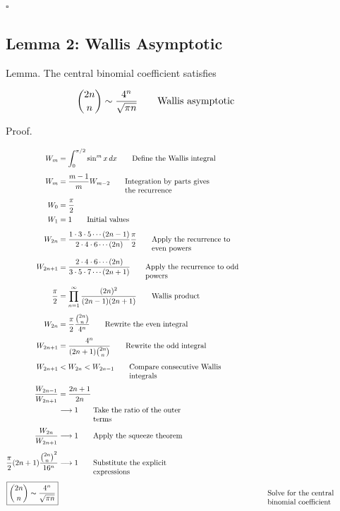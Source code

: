 \documentclass{article}
\newcommand{\justwidth}{0.36\textwidth}
\newcommand{\just}[1]{\parbox[t]{\justwidth}{\raggedright #1}}
\begin{document}
$\square$

\subsection{Lemma 2: Wallis Asymptotic}
Lemma. The central binomial coefficient satisfies

\begin{align*}
\binom{2n}{n}
&\sim
\frac{4^n}{\sqrt{\pi n}}
\tag*{\just{Wallis asymptotic}}
\end{align*}

Proof.

\begin{align*}
W_m
&=
\int_0^{\pi/2}
\sin^m x\,dx
\tag*{\just{Define the Wallis integral}}
\\[0.45em]
W_m
&=
\frac{m-1}{m}
W_{m-2}
\tag*{\just{Integration by parts gives the recurrence}}
\\[0.45em]
W_0
&=
\frac{\pi}{2}
\\
W_1
&=
1
\tag*{\just{Initial values}}
\\[0.45em]
W_{2n}
&=
\frac{1\cdot3\cdot5\cdots(2n-1)}
{2\cdot4\cdot6\cdots(2n)}
\frac{\pi}{2}
\tag*{\just{Apply the recurrence to even powers}}
\\[0.45em]
W_{2n+1}
&=
\frac{2\cdot4\cdot6\cdots(2n)}
{3\cdot5\cdot7\cdots(2n+1)}
\tag*{\just{Apply the recurrence to odd powers}}
\\[0.45em]
\frac{\pi}{2}
&=
\prod_{n=1}^{\infty}
\frac{(2n)^2}
{(2n-1)(2n+1)}
\tag*{\just{Wallis product}}
\\[0.45em]
W_{2n}
&=
\frac{\pi}{2}
\frac{\binom{2n}{n}}{4^n}
\tag*{\just{Rewrite the even integral}}
\\[0.45em]
W_{2n+1}
&=
\frac{4^n}
{(2n+1)\binom{2n}{n}}
\tag*{\just{Rewrite the odd integral}}
\\[0.45em]
W_{2n+1}
&<
W_{2n}
<
W_{2n-1}
\tag*{\just{Compare consecutive Wallis integrals}}
\\[0.45em]
\frac{W_{2n-1}}
{W_{2n+1}}
&=
\frac{2n+1}{2n}
\\
&\longrightarrow
1
\tag*{\just{Take the ratio of the outer terms}}
\\[0.45em]
\frac{W_{2n}}
{W_{2n+1}}
&\longrightarrow
1
\tag*{\just{Apply the squeeze theorem}}
\\[0.45em]
\frac{\pi}{2}
(2n+1)
\frac{\binom{2n}{n}^2}{16^n}
&\longrightarrow
1
\tag*{\just{Substitute the explicit expressions}}
\\[0.45em]
\boxed{
\binom{2n}{n}
\sim
\frac{4^n}{\sqrt{\pi n}}
}
&&
\tag*{\just{Solve for the central binomial coefficient}}
\end{align*}
\end{document}
